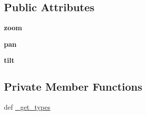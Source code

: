 \subsection*{\-Public \-Attributes}
\begin{DoxyCompactItemize}
\item 
\hypertarget{class_c_i_t_i_u_s___control___communication_1_1msg_1_1__msg__rear_camera_info_1_1msg__rear_camera_info_a4ef227cff72deb99da5f2127688fac62}{{\bfseries zoom}}\label{class_c_i_t_i_u_s___control___communication_1_1msg_1_1__msg__rear_camera_info_1_1msg__rear_camera_info_a4ef227cff72deb99da5f2127688fac62}

\item 
\hypertarget{class_c_i_t_i_u_s___control___communication_1_1msg_1_1__msg__rear_camera_info_1_1msg__rear_camera_info_ad536c6d80315696c06ec97bd77cf6d3f}{{\bfseries pan}}\label{class_c_i_t_i_u_s___control___communication_1_1msg_1_1__msg__rear_camera_info_1_1msg__rear_camera_info_ad536c6d80315696c06ec97bd77cf6d3f}

\item 
\hypertarget{class_c_i_t_i_u_s___control___communication_1_1msg_1_1__msg__rear_camera_info_1_1msg__rear_camera_info_a0e74936fab8e256f9001f31912596a03}{{\bfseries tilt}}\label{class_c_i_t_i_u_s___control___communication_1_1msg_1_1__msg__rear_camera_info_1_1msg__rear_camera_info_a0e74936fab8e256f9001f31912596a03}

\end{DoxyCompactItemize}
\subsection*{\-Private \-Member \-Functions}
\begin{DoxyCompactItemize}
\item 
def \hyperlink{class_c_i_t_i_u_s___control___communication_1_1msg_1_1__msg__rear_camera_info_1_1msg__rear_camera_info_a71cc5fa0c254f4d8bd2420d2c57301b6}{\-\_\-get\-\_\-types}
\end{DoxyCompactItemize}

